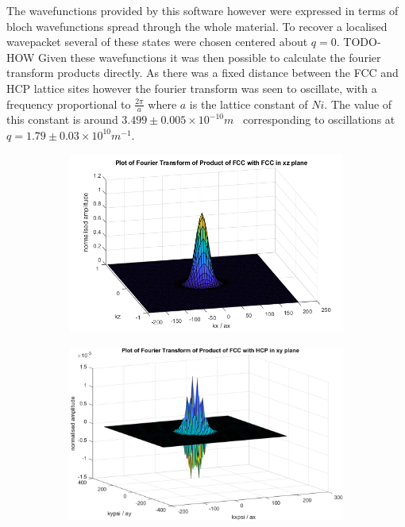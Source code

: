The wavefunctions provided by this software however
were expressed in terms of bloch wavefunctions spread
through the whole material.
To recover a localised
wavepacket several of these states were chosen
centered about \(q=0\).
TODO-HOW
Given these wavefunctions
it was then possible to calculate the fourier
transform products directly. As there was a fixed
distance between the FCC and HCP lattice
sites however the fourier transform was seen to
oscillate, with a frequency proportional to
\(\frac{2\pi}{a}\) where \(a\) is the lattice
constant of \(Ni\). The value of this constant
is around \(3.499\pm{}0.005\times{}10^{-10}m\)~\cite{PhysRev.25.753}
corresponding to oscillations at
\(q = 1.79 \pm 0.03 \times{}10^{10}m^{-1}\).
\begin{figure}
  \centering
  \begin{subfigure}{0.45\linewidth}
    \centering
    \includegraphics[width= 0.9\linewidth]{Figures/Model/Plot of fourier transform of the wavefunction fccfcc xz plane.png}
    \label{fig:diagonal hydrogen matrix element no oscillation}
  \end{subfigure}
  \hfill
  \begin{subfigure}{0.45\linewidth}
    \centering
    \includegraphics[width= 0.9\linewidth]{Figures/Model/Plot of fourier transform of the wavefunction.png}

\end{subfigure}
\end{figure}
